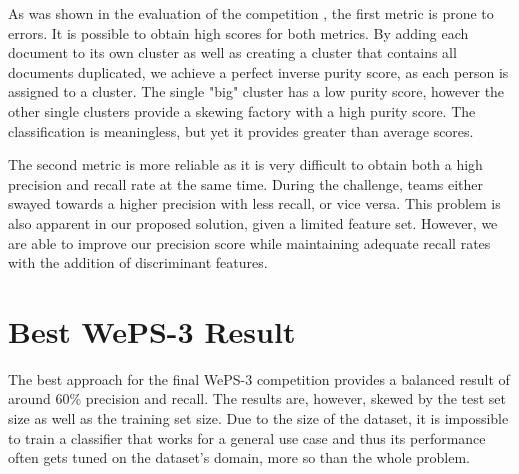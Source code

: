 As was shown in the evaluation of the competition \cite{weps2-eval}, the first
metric is prone to errors. It is possible to obtain high scores for both metrics.
By adding each document to its own cluster as well as creating a cluster that contains
all documents duplicated, we achieve a perfect inverse purity score, as each
person is assigned to a cluster. The single "big" cluster has a low purity score, however the
other single clusters provide a skewing factory with a high purity score. The
classification is meaningless, but yet it provides greater than average scores.

The second metric is more reliable as it is very difficult to obtain both a high
precision and recall rate at the same time. During the challenge, teams either swayed
towards a higher precision with less recall, or vice versa. This problem is
also apparent in our proposed solution, given a limited feature set. However,
we are able to improve our precision score while maintaining adequate recall
rates with the addition of discriminant features.

\section{Best WePS-3 Result}
\label{sub-sub-sec:best-weps-result}
The best approach \cite{weps-best} for the final WePS-3 competition provides a
balanced result of around 60\% \cite{weps3-eval} precision and recall. The results
are, however, skewed by the test set size as well as the training set size. Due
to the size of the dataset, it is impossible to train a classifier that works for
a general use case and thus its performance often gets tuned on the dataset's domain,
more so than the whole problem.

